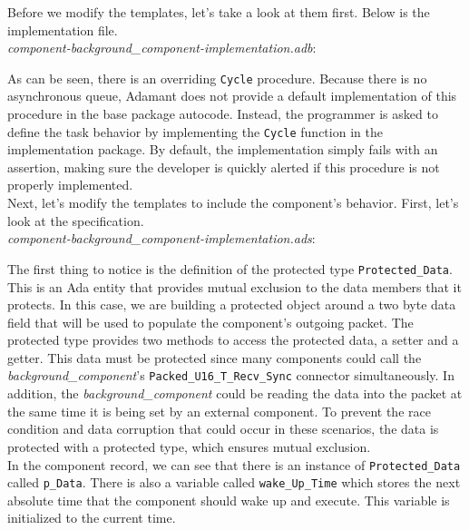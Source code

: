 Before we modify the templates, let's take a look at them first. Below is the implementation file. \\

\textit{component-background\_component-implementation.adb}:

As can be seen, there is an overriding \texttt{Cycle} procedure. Because there is no asynchronous queue, Adamant does not provide a default implementation of this procedure in the base package autocode. Instead, the programmer is asked to define the task behavior by implementing the \texttt{Cycle} function in the implementation package. By default, the implementation simply fails with an assertion, making sure the developer is quickly alerted if this procedure is not properly implemented. \\

Next, let's modify the templates to include the component's behavior. First, let's look at the specification. \\

\textit{component-background\_component-implementation.ads}:

The first thing to notice is the definition of the protected type \texttt{Protected\_Data}. This is an Ada entity that provides mutual exclusion to the data members that it protects. In this case, we are building a protected object around a two byte data field that will be used to populate the component's outgoing packet. The protected type provides two methods to access the protected data, a setter and a getter. This data must be protected since many components could call the \textit{background\_component}'s \texttt{Packed\_U16\_T\_Recv\_Sync} connector simultaneously. In addition, the \textit{background\_component} could be reading the data into the packet at the same time it is being set by an external component. To prevent the race condition and data corruption that could occur in these scenarios, the data is protected with a protected type, which ensures mutual exclusion. \\

In the component record, we can see that there is an instance of \texttt{Protected\_Data} called \texttt{p\_Data}. There is also a variable called \texttt{wake\_Up\_Time} which stores the next absolute time that the component should wake up and execute. This variable is initialized to the current time. \\

